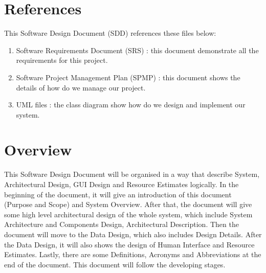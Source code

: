 \documentclass[11pt, a4paper]{report}
\begin{document}
\section{References}
This Software Design Document (SDD) references these files below:
\begin{enumerate}

  \item Software Requirements Document (SRS) : this document demonstrate all the requirements for this project.

  \item Software Project Management Plan (SPMP) : this document shows the details of how do we manage our project.

  \item UML files : the class diagram show how do we design and implement our system.

\end{enumerate}


\section{Overview}
This Software Design Document will be organised in a way that describe System, Architectural Design, GUI Design and Resource Estimates logically. In the beginning of the document, it will give an introduction of this document (Purpose and Scope) and System Overview. After that, the document will give some high level architectural design of the whole system, which include System Architecture and Components Design, Architectural Description. Then the document will move to the Data Design, which also includes Design Details. After the Data Design, it will also shows the design of Human Interface and Resource Estimates. Lastly, there are some Definitions, Acronyms and Abbreviations at the end of the document. This document will follow the developing stages.
\end{document}
